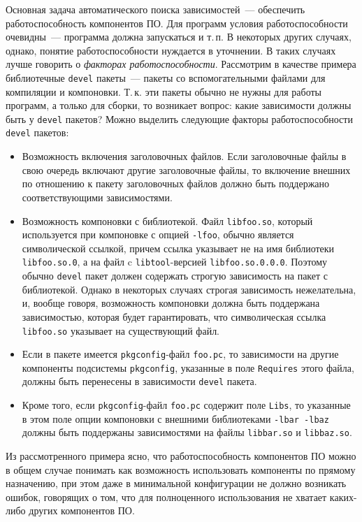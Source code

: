 \documentclass[russian,a4paper,12pt,titlepage]{article}
\begin{document}
Основная задача автоматического поиска зависимостей~--- обеспечить работоспособность компонентов ПО.
Для программ условия работоспособности очевидны~--- программа должна запускаться и т.\,п.
В некоторых других случаях, однако, понятие работоспособности нуждается в уточнении.  В таких случаях
лучше говорить о \emph{факторах работоспособности}.  Рассмотрим в качестве примера библиотечные \texttt{devel}
пакеты~--- пакеты со вспомогательными файлами для компиляции и компоновки.  Т.\,к. эти пакеты обычно не нужны
для работы программ, а только для сборки, то возникает вопрос: какие зависимости должны быть у \texttt{devel}
пакетов?  Можно выделить следующие факторы работоспособности \texttt{devel} пакетов:
\begin{itemize}
\item Возможность включения заголовочных файлов.
Если заголовочные файлы в свою очередь включают другие заголовочные файлы, то включение внешних
по отношению к пакету заголовочных файлов должно быть поддержано соответствующими зависимостями.
\item Возможность компоновки с библиотекой.
Файл \verb|libfoo.so|, который используется при компоновке с опцией \verb|-lfoo|, обычно является
символической ссылкой, причем ссылка указывает не на имя библиотеки \verb|libfoo.so.0|, а на файл
c \verb|libtool|-версией \verb|libfoo.so.0.0.0|.  Поэтому обычно \verb|devel| пакет должен содержать
строгую зависимость на пакет с библиотекой.  Однако в некоторых случаях строгая зависимость нежелательна,
и, вообще говоря, возможность компоновки должна быть поддержана зависимостью, которая будет гарантировать,
что символическая ссылка \verb|libfoo.so| указывает на существующий файл.
\item Если в пакете имеется \verb|pkgconfig|-файл \verb|foo.pc|, то зависимости на другие компоненты
подсистемы \verb|pkgconfig|, указанные в поле \verb|Requires| этого файла, должны быть перенесены в зависимости
\verb|devel| пакета.
\item Кроме того, если \verb|pkgconfig|-файл \verb|foo.pc| содержит поле \verb|Libs|, то указанные в этом поле
опции компоновки с внешними библиотеками \texttt{-lbar -lbaz} должны быть поддержаны зависимостями на файлы
\verb|libbar.so| и \verb|libbaz.so|.
\end{itemize}

Из рассмотренного примера ясно, что работоспособность компонентов ПО можно в общем случае понимать
как возможность использовать компоненты по прямому назначению, при этом даже в минимальной конфигурации
не должно возникать ошибок, говорящих о том, что для полноценного использования не хватает каких-либо
других компонентов ПО.
\end{document}
